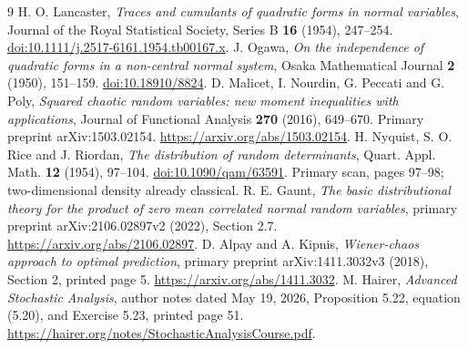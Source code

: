 \documentclass[11pt]{article}
\begin{document}
\begin{thebibliography}{9}
 H. O. Lancaster,
\emph{Traces and cumulants of quadratic forms in normal variables},
Journal of the Royal Statistical Society, Series B \textbf{16}
(1954), 247--254.
\href{https://doi.org/10.1111/j.2517-6161.1954.tb00167.x}
{doi:10.1111/j.2517-6161.1954.tb00167.x}.
 J. Ogawa,
\emph{On the independence of quadratic forms in a non-central normal system},
Osaka Mathematical Journal \textbf{2} (1950), 151--159.
\href{https://doi.org/10.18910/8824}{doi:10.18910/8824}.
 D. Malicet, I. Nourdin, G. Peccati and G. Poly,
\emph{Squared chaotic random variables: new moment inequalities
with applications}, Journal of Functional Analysis \textbf{270}
(2016), 649--670. Primary preprint arXiv:1503.02154.
\url{https://arxiv.org/abs/1503.02154}.
 H. Nyquist, S. O. Rice and J. Riordan,
\emph{The distribution of random determinants},
Quart. Appl. Math. \textbf{12} (1954), 97--104.
\href{https://doi.org/10.1090/qam/63591}{doi:10.1090/qam/63591}.
Primary scan, pages 97--98; two-dimensional density already classical.
 R. E. Gaunt,
\emph{The basic distributional theory for the product of zero mean
correlated normal random variables}, primary preprint arXiv:2106.02897v2
(2022), Section 2.7.
\url{https://arxiv.org/abs/2106.02897}.
 D. Alpay and A. Kipnis,
\emph{Wiener-chaos approach to optimal prediction}, primary preprint
arXiv:1411.3032v3 (2018), Section 2, printed page 5.
\url{https://arxiv.org/abs/1411.3032}.
 M. Hairer, \emph{Advanced Stochastic Analysis}, author notes dated May 19, 2026, Proposition 5.22, equation (5.20), and Exercise 5.23, printed page 51. \url{https://hairer.org/notes/StochasticAnalysisCourse.pdf}.
\end{thebibliography}
\end{document}
